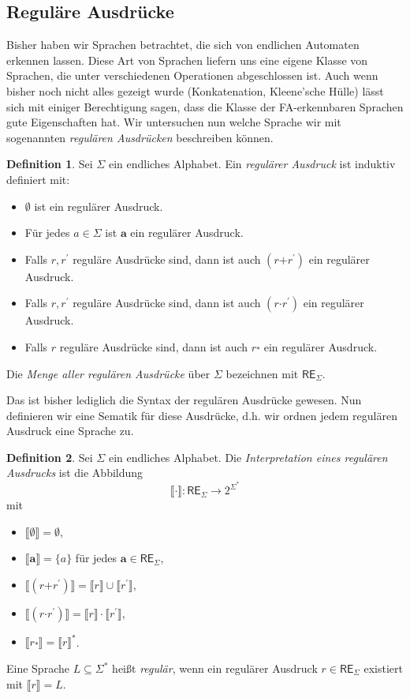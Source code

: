 \documentclass[11pt, a4paper]{article}
\theoremstyle{definition}
\newtheorem{definition}{Definition}[section]
\theoremstyle{plain}
\numberwithin{equation}{section}
\begin{document}
\subsection{Reguläre Ausdrücke}\label{sec:regular_regexp}
Bisher haben wir Sprachen betrachtet, die sich von endlichen Automaten erkennen lassen. Diese Art von Sprachen liefern uns eine eigene Klasse von Sprachen, die unter verschiedenen Operationen abgeschlossen ist. Auch wenn bisher noch nicht alles gezeigt wurde (Konkatenation, Kleene'sche Hülle) lässt sich mit einiger Berechtigung sagen, dass die Klasse der FA-erkennbaren Sprachen gute Eigenschaften hat. Wir untersuchen nun welche Sprache wir mit sogenannten \textit{regulären Ausdrücken} beschreiben können.
\begin{definition}\label{def:regexsyntax}
	Sei \( \Sigma \) ein endliches Alphabet. Ein \textit{regulärer Ausdruck} ist induktiv definiert mit:
	\begin{itemize}
		\item \( \bm{\emptyset} \) ist ein regulärer Ausdruck.
		\item Für jedes \( a \in \Sigma \) ist \( \bm{a} \) ein regulärer Ausdruck.
		\item Falls \( r, r^\prime \) reguläre Ausdrücke sind, dann ist auch \( (r \bm{+} r^\prime) \) ein regulärer Ausdruck.
		\item Falls \( r, r^\prime \) reguläre Ausdrücke sind, dann ist auch \( (r \bm{\cdot} r^\prime) \) ein regulärer Ausdruck.
		\item Falls \( r \) reguläre Ausdrücke sind, dann ist auch \( r \overset{\bm{\ast}}{} \) ein regulärer Ausdruck.
	\end{itemize}
	Die \textit{Menge aller regulären Ausdrücke} über \( \Sigma \) bezeichnen mit \( \mathsf{RE}_\Sigma \).
\end{definition}
Das ist bisher lediglich die Syntax der regulären Ausdrücke gewesen. Nun definieren wir eine Sematik für diese Ausdrücke, d.h. wir ordnen jedem regulären Ausdruck eine Sprache zu.
\begin{definition}
	Sei \( \Sigma \) ein endliches Alphabet. Die \textit{Interpretation eines regulären Ausdrucks} ist die Abbildung
	\[
		\llbracket \cdot \rrbracket \colon \mathsf{RE}_\Sigma \to 2^{\Sigma^\ast}
	\]
	mit
	\begin{itemize}
		\item \( \llbracket \bm{\emptyset} \rrbracket = \emptyset \),
		\item \( \llbracket \bm{a} \rrbracket = \{ a \} \) für jedes \( \bm{a} \in \mathsf{RE}_\Sigma \),
		\item \( \llbracket (r \bm{+} r^\prime) \rrbracket = \llbracket r \rrbracket \cup \llbracket r^\prime \rrbracket \),
		\item \( \llbracket (r \bm{\cdot} r^\prime) \rrbracket = \llbracket r \rrbracket \cdot \llbracket r^\prime \rrbracket \),
		\item \( \llbracket r \overset{\bm{\ast}}{} \rrbracket = \llbracket r \rrbracket^\ast \).
	\end{itemize}
	Eine Sprache \( L \subseteq \Sigma^\ast \) heißt \textit{regulär}, wenn ein regulärer Ausdruck \( r \in \mathsf{RE}_\Sigma \) existiert mit \( \llbracket r \rrbracket = L \).
\end{definition}
\end{document}
